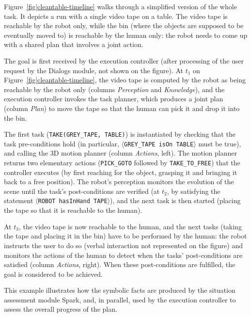 \documentclass[preprint,3p,times]{elsarticle}
\newcommand{\concept}[1]{{\small \texttt{#1}}}
\newcommand{\stmt}[1]{{\footnotesize\tt$\langle$#1\relax$\rangle$}}
\begin{document}
Figure~\ref{fig|cleantable-timeline} walks through a simplified version of the whole
task. It depicts a run with a single video tape on a table. The video tape is
reachable by the robot only, while the bin (where the objects are supposed to be
eventually moved to) is reachable by the human only: the robot needs to come up
with a shared plan that involves a joint action.

The goal is first received by the execution controller (after processing of the
user request by the {\sc Dialogs} module, not shown on the figure). At $t_1$ on
Figure~\ref{fig|cleantable-timeline}, the video tape is computed by the robot as being
reachable by the robot only (columns \emph{Perception} and \emph{Knowledge}),
and the execution controller invokes the task planner, which produces a joint
plan (column \emph{Plan}) to move the tape so that the human can pick it and
drop it into the bin.

The first task (\concept{TAKE(GREY\_TAPE, TABLE)}) is instantiated by checking
that the task pre-conditions hold (in particular, \stmt{GREY\_TAPE isOn TABLE}
must be true), and calling the 3D motion planner (column \emph{Actions},
left). The motion planner returns two elementary actions ({\tt PICK\_GOTO} followed
by {\tt TAKE\_TO\_FREE}) that the controller executes (by first reaching for
the object, grasping it and bringing it back to a free position).  The robot's
perception monitors the evolution of the scene until the task's post-conditions
are verified (at $t_2$, by satisfying the statement \stmt{ROBOT hasInHand
TAPE}), and the next task is then started (placing the tape so that it is
reachable to the human).

At $t_3$, the video tape is now reachable to the human, and the next tasks (taking the
tape and placing it in the bin) have to be performed by the human: the robot
instructs the user to do so (verbal interaction not represented on the figure) and
monitors the actions of the human to detect when the tasks' post-conditions are
satisfied (column \emph{Actions}, right). When these post-conditions are
fulfilled, the goal is considered to be achieved.

This example illustrates how the symbolic facts are produced by the
situation assessment module {\sc Spark}, and, in parallel, used by the execution controller to
assess the overall progress of the plan.
\end{document}
